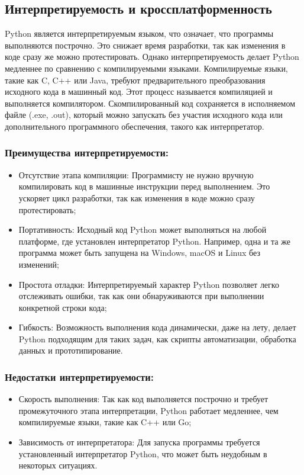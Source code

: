 \subsection*{Интерпретируемость и кроссплатформенность}

Python является интерпретируемым языком, что означает, что программы выполняются построчно. Это снижает время разработки, так как изменения в коде сразу же можно протестировать. Однако интерпретируемость делает Python медленнее по сравнению с компилируемыми языками. Компилируемые языки, такие как C, C++ или Java, требуют предварительного преобразования исходного кода в машинный код. Этот процесс называется компиляцией и выполняется компилятором. Скомпилированный код сохраняется в исполняемом файле (.exe, .out), который можно запускать без участия исходного кода или дополнительного программного обеспечения, такого как интерпретатор.

\subsubsection*{Преимущества интерпретируемости:}
\begin{itemize}
    \item Отсутствие этапа компиляции: Программисту не нужно вручную компилировать код в машинные инструкции перед выполнением. Это ускоряет цикл разработки, так как изменения в коде можно сразу протестировать;
    \item Портативность: Исходный код Python может выполняться на любой платформе, где установлен интерпретатор Python. Например, одна и та же программа может быть запущена на Windows, macOS и Linux без изменений;
    \item Простота отладки: Интерпретируемый характер Python позволяет легко отслеживать ошибки, так как они обнаруживаются при выполнении конкретной строки кода;
    \item Гибкость: Возможность выполнения кода динамически, даже на лету, делает Python подходящим для таких задач, как скрипты автоматизации, обработка данных и прототипирование.
\end{itemize}

\subsubsection*{Недостатки интерпретируемости:}
\begin{itemize}
    \item Скорость выполнения: Так как код выполняется построчно и требует промежуточного этапа интерпретации, Python работает медленнее, чем компилируемые языки, такие как C++ или Go;
    \item Зависимость от интерпретатора: Для запуска программы требуется установленный интерпретатор Python, что может быть неудобным в некоторых ситуациях.
\end{itemize}

